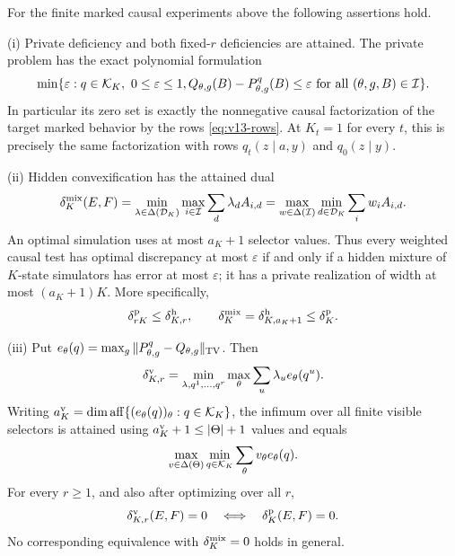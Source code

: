 \begin{theorem}
\label{thm:v13-main}
For the finite marked causal experiments above the following assertions
hold.

\smallskip\noindent
\textup{(i)} Private deficiency and both fixed-$r$ deficiencies are
attained. The private problem has the exact polynomial formulation
\begin{equation}\label{eq:v13-polynomial}
 \min\{\varepsilon: q\in\mathcal K_K,\ 0\le\varepsilon\le1,
    Q_{\theta,g}(B)-P_{\theta,g}^q(B)\le\varepsilon
                         \text{ for all }(\theta,g,B)\in\mathcal I\}.
\end{equation}
In particular its zero set is exactly the nonnegative causal
factorization of the target marked behavior by the rows
\eqref{eq:v13-rows}. At $K_t=1$ for every $t$, this is precisely the same
factorization with rows $q_t(z\mid a,y)$ and $q_0(z\mid y)$.

\smallskip\noindent
\textup{(ii)} Hidden convexification has the attained dual
\begin{equation}\label{eq:v13-dual}
 \delta^{\rm mix}_K(E,F)=
 \min_{\lambda\in\Delta(\mathcal D_K)}\max_{i\in\mathcal I}
                    \sum_d\lambda_d A_{i,d}
 =\max_{w\in\Delta(\mathcal I)}\min_{d\in\mathcal D_K}
                    \sum_iw_i A_{i,d}.
\end{equation}
An optimal simulation uses at most $a_K+1$ selector values. Thus every
weighted causal test has optimal discrepancy at most $\varepsilon$ if
and only if a hidden mixture of $K$-state simulators has error at most
$\varepsilon$; it has a private realization of width at most $(a_K+1)K$.
More specifically,
\begin{equation}\label{eq:v13-priced}
 \delta^{\rm p}_{rK}\le\delta^{\rm h}_{K,r},\qquad
 \delta^{\rm mix}_K=\delta^{\rm h}_{K,a_K+1}\le\delta^{\rm p}_K.
\end{equation}

\smallskip\noindent
\textup{(iii)} Put
$e_\theta(q)=\max_g\|P_{\theta,g}^q-Q_{\theta,g}\|_{\rm TV}$.
Then
\begin{equation}\label{eq:v13-exposed}
 \delta^{\rm v}_{K,r}=\min_{\lambda,q^1,\ldots,q^r}
                  \max_\theta\sum_u\lambda_u e_\theta(q^u).
\end{equation}
Writing $a_K^{\rm v}=\dim\operatorname{aff}\{(e_\theta(q))_\theta:q\in\mathcal K_K\}$,
the infimum over all finite visible selectors is attained using
$a_K^{\rm v}+1\le|\Theta|+1$ values and equals
\begin{equation}\label{eq:v13-visible-dual}
 \max_{v\in\Delta(\Theta)}\min_{q\in\mathcal K_K}
                          \sum_\theta v_\theta e_\theta(q).
\end{equation}
For every $r\ge1$, and also after optimizing over all $r$,
\begin{equation}\label{eq:v13-zeros}
 \delta^{\rm v}_{K,r}(E,F)=0\quad\Longleftrightarrow\quad\delta^{\rm p}_K(E,F)=0.
\end{equation}
No corresponding equivalence with $\delta^{\rm mix}_K=0$ holds in general.


\end{theorem}
